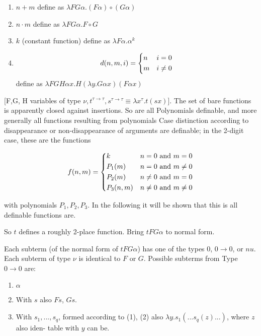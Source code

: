 \documentclass[11pt]{article}
\begin{document}
\begin{enumerate}
    \item \(n + m\) define as \(\lambda F G \alpha. (F \alpha) \circ (G \alpha)\)
    \item \(n \cdot m\) define as \(\lambda F G \alpha. F \circ G\)
    \item \(k\) (constant function) define as \(\lambda F \alpha . \alpha ^ k\)
    \item \[ d(n, m, i) =
        \begin{dcases}
            n & i = 0 \\
            m & i \neq 0 \\
        \end{dcases}
    \] define as \(\lambda F G H \alpha x. H(\lambda y. G \alpha x) (F \alpha x)\)
\end{enumerate}

[F,G, H variables of type \(\nu, t^{\tau \rightarrow \tau}, s^{\tau \rightarrow \tau} \equiv \lambda x^\tau. t(s x)\)]. The set of
bare functions is apparently closed against insertions. So are all Polynomials definable, and more generally all functions resulting from polynomials Case distinction according to disappearance or non-disappearance of arguments
are definable; in the 2-digit case, these are the functions

\[ f(n, m) =
        \begin{dcases}
            k & n = 0 \text{ and } m = 0 \\
            P_1(m) & n = 0 \text{ and } m \neq 0 \\
            P_2(m) & n \neq 0 \text{ and } m = 0 \\
            P_3(n, m) & n \neq 0 \text{ and } m \neq 0 \\
        \end{dcases}
\]

with polynomials \(P_1, P_2, P_3\). In the following it will be shown that this is all definable functions are.

So \(t\) defines a roughly 2-place function. Bring \(t F G \alpha\) to normal form.

Each subterm (of the normal form of \(t F G \alpha\)) has one of the types $0$, $0 \rightarrow 0$, or \(nu\). Each subterm of type \(\nu\) is identical to $F$ or $G$. Possible subterms from Type \(0 \rightarrow 0\) are:

\begin{enumerate}
    \item \(\alpha\)
    \item With $s$ also $Fs$, $Gs$.
    \item With \(s_1, ..., s_q\), formed according to (1), (2) also \(\lambda y. s_1 (... s_q(z)...)\), where $z$ also iden-
    table with $y$ can be.
\end{enumerate}
\end{document}
